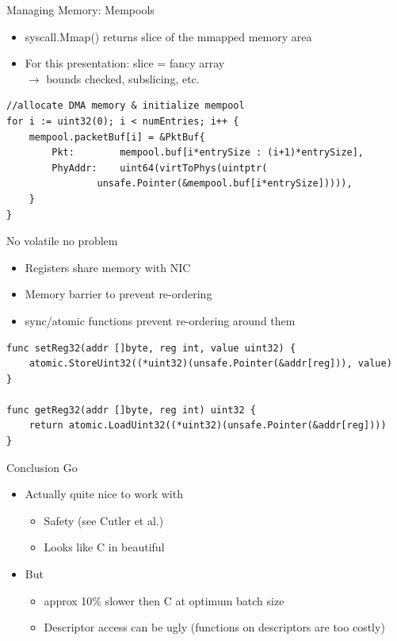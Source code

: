 \documentclass[NET,english,aspectratio=169,notitleframe]{tumbeamer}
\begin{document}
\begin{frame}[fragile]{Managing Memory: Mempools}
\begin{itemize}
\item syscall.Mmap() returns slice of the mmapped memory area
\item For this presentation: slice = fancy array\\
	$\rightarrow$ bounds checked, subslicing, etc.
\end{itemize}

\begin{verbatim}
//allocate DMA memory & initialize mempool
for i := uint32(0); i < numEntries; i++ {
	mempool.packetBuf[i] = &PktBuf{
		Pkt:        mempool.buf[i*entrySize : (i+1)*entrySize],
		PhyAddr:    uint64(virtToPhys(uintptr(
			    unsafe.Pointer(&mempool.buf[i*entrySize])))),
	}
}
\end{verbatim}
\end{frame}

\begin{frame}[fragile]{No volatile no problem}
\begin{itemize}
\item Registers share memory with NIC
\item Memory barrier to prevent re-ordering
\item sync/atomic functions prevent re-ordering around them
\end{itemize}
\begin{verbatim}
func setReg32(addr []byte, reg int, value uint32) {
	atomic.StoreUint32((*uint32)(unsafe.Pointer(&addr[reg])), value)
}

func getReg32(addr []byte, reg int) uint32 {
	return atomic.LoadUint32((*uint32)(unsafe.Pointer(&addr[reg])))
}
\end{verbatim}
\end{frame}

\begin{frame}{Conclusion Go}
\begin{itemize}
\item Actually quite nice to work with
\begin{itemize}
\item Safety (see Cutler et al.)
\item Looks like C in beautiful
\end{itemize}
\item<2-> But
\begin{itemize}
\item<2-> approx 10\% slower then C at optimum batch size
\item<2-> Descriptor access can be ugly (functions on descriptors are too costly)
\end{itemize}
\end{itemize}
\end{frame}
\end{document}
